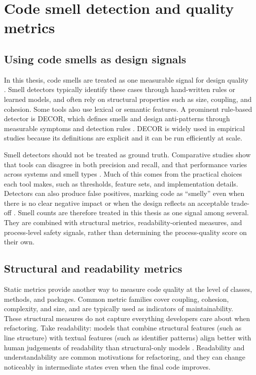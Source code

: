 \section{Code smell detection and quality metrics}
\label{sec:smells-metrics}

\subsection{Using code smells as design signals}
In this thesis, code smells are treated as one measurable signal for design quality \cite{fowler1999refactoring}. Smell detectors typically identify these cases through hand-written rules or learned models, and often rely on structural properties such as size, coupling, and cohesion. Some tools also use lexical or semantic features. A prominent rule-based detector is DECOR, which defines smells and design anti-patterns through measurable symptoms and detection rules \cite{moha2010decor}. DECOR is widely used in empirical studies because its definitions are explicit and it can be run efficiently at scale.

Smell detectors should not be treated as ground truth. Comparative studies show that tools can disagree in both precision and recall, and that performance varies across systems and smell types \cite{paiva2017evaluation}. Much of this comes from the practical choices each tool makes, such as thresholds, feature sets, and implementation details. Detectors can also produce false positives, marking code as ``smelly'' even when there is no clear negative impact or when the design reflects an acceptable trade-off \cite{arcellifontana2016falsepositives}. Smell counts are therefore treated in this thesis as one signal among several. They are combined with structural metrics, readability-oriented measures, and process-level safety signals, rather than determining the process-quality score on their own.

\subsection{Structural and readability metrics}
Static metrics provide another way to measure code quality at the level of classes, methods, and packages. Common metric families cover coupling, cohesion, complexity, and size, and are typically used as indicators of maintainability. These structural measures do not capture everything developers care about when refactoring. Take readability: models that combine structural features (such as line structure) with textual features (such as identifier patterns) align better with human judgements of readability than structural-only models \cite{scalabrino2018readability}. Readability and understandability are common motivations for refactoring, and they can change noticeably in intermediate states even when the final code improves.

